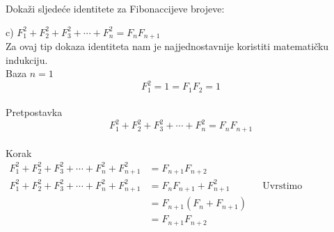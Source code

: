 \documentclass[exam.tex]{subfiles}
\begin{document}
	Dokaži sljedeće identitete za Fibonaccijeve brojeve:
	
	c) \( F^2_1 + F^2_2 + F^2_3 + \cdots + F^2_n = F_n F_{n + 1} \) \\
	
	Za ovaj tip dokaza identiteta nam je najjednostavnije koristiti matematičku indukciju. \\
	
	Baza \(n = 1\)
	\[ F^2_1 = 1 = F_1 F_2 = 1 \] \\
	
	Pretpostavka
	\[ F^2_1 + F^2_2 + F^2_3 + \cdots + F^2_n = F_n F_{n + 1} \] \\
	
	Korak
	\begin{align*}
		F^2_1 + F^2_2 + F^2_3 + \cdots + F^2_n + F^2_{n + 1} &= F_{n + 1} F_{n + 2} \\
		F^2_1 + F^2_2 + F^2_3 + \cdots + F^2_n + F^2_{n + 1} &= F_n F_{n + 1} + F^2_{n + 1} && \text{Uvrstimo pretpostavku} \\
		&= F_{n + 1} (F_n + F_{n + 1}) \\
		&= F_{n + 1} F_{n + 2}
	\end{align*}
\end{document}
